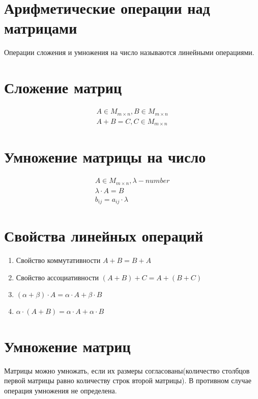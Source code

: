 \documentclass[12pt,a4paper]{report}
\begin{document}
\section{Арифметические операции над матрицами}
Операции сложения и умножения на число называются линейными операциями.
\section{Сложение матриц}
\begin{gather*}
    A \in M_{m \times n}, B \in M_{m \times n} \\
    A + B = C,  C \in M_{m \times n}
\end{gather*}

\section{Умножение матрицы на число}

\begin{gather*}
    A \in M_{m \times n}, \lambda - number \\
    \lambda \cdot A = B \\
    b_{ij} = a_{ij} \cdot \lambda
\end{gather*}

\section{Свойства линейных операций}

\begin{enumerate}
    \item Свойство коммутативности $A + B = B + A$

    \item Свойство ассоциативности $(A + B) + C = A + (B + C)$

    \item $(\alpha + \beta) \cdot A = \alpha \cdot A + \beta \cdot B$

    \item $\alpha \cdot (A + B) = \alpha \cdot A + \alpha \cdot B$

\end{enumerate}
\section{Умножение матриц}

Матрицы можно умножать, если их размеры согласованы(количество столбцов первой матрицы равно количеству строк второй матрицы). В противном случае операция умножения не определена.
\end{document}
